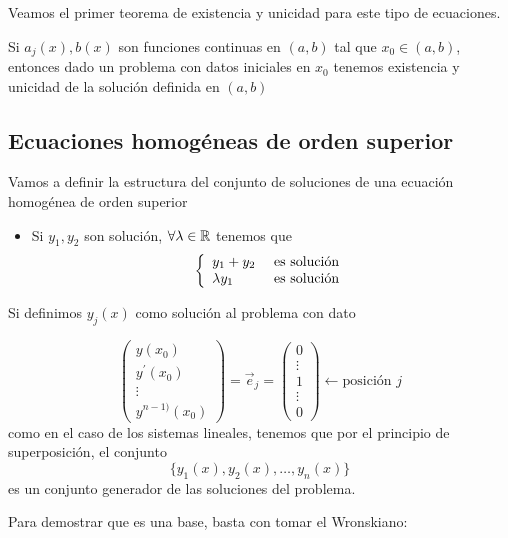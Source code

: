 Veamos el primer teorema de existencia y unicidad para este tipo de ecuaciones.
\begin{theorem}
Si $a_j(x), b(x)$ son funciones continuas en $(a,b)$ tal que $x_0 \in (a,b)$,  entonces dado un problema con datos iniciales en $x_0$ tenemos existencia y unicidad de la solución definida en $(a,b)$
\end{theorem}

\subsection{Ecuaciones homogéneas de orden superior}

Vamos a definir la estructura del conjunto de soluciones de una ecuación homogénea de orden superior

\begin{itemize}
\item Si $y_1,y_2$ son solución, $\forall \lambda\in \mathbb{R}$ tenemos que
\begin{equation}
\left\lbrace
	\begin{array}{l l}
		y_1+y_2 &\text{ es solución}\\
		\lambda y_1 &\text{ es solución}\\
	\end{array}
\right.
\end{equation}
\end{itemize}
Si definimos
$y_j(x)$ como solución al problema con dato

\begin{equation}
\begin{pmatrix}
y(x_0)\\y^\prime(x_0)\\\vdots\\y^{n-1)}(x_0)
\end{pmatrix} = \vec{e}_j = \begin{pmatrix}
0\\\vdots\\1\\\vdots\\0
\end{pmatrix}\longleftarrow \text{posición }j
\end{equation}
como en el caso de los sistemas lineales, tenemos que por el principio de superposición, el conjunto $$\{ y_1(x), y_2(x), \hdots, y_n(x) \}$$ es un conjunto generador de las soluciones del problema.

Para demostrar que es una base, basta con tomar el Wronskiano:

